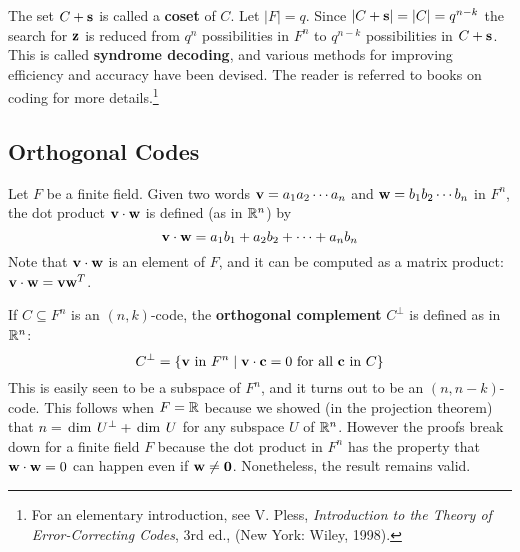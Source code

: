 The set $C + \textbf{s}$ is called a \textbf{coset} of $C$. Let $|F| = q$. Since $|C + \textbf{s}| = |C| = q^{n - k}$ the search for $\textbf{z}$ is reduced from $q^{n}$ possibilities in $F^{n}$ to $q^{n - k}$ possibilities in $C + \textbf{s}$. This is called \textbf{syndrome decoding},  and various methods for improving efficiency and accuracy have been devised. The reader is referred to books on coding for more details.\footnote{For an elementary introduction, see V. Pless, \textit{Introduction to the Theory of Error-Correcting Codes}, 3rd ed., (New York: Wiley, 1998).}%

\subsection*{Orthogonal Codes}

Let $F$ be a finite field. Given two words $\textbf{v} = a_{1} a_{2} \cdots a_{n}$ and $\textbf{w} = b_{1} b_{2} \cdots b_{n}$ in $F^{n}$, the dot product $\textbf{v} \cdot \textbf{w}$ is defined (as in $\mathbb{R}^n$) by
\begin{equation*}
\textbf{v} \cdot \textbf{w} = a_{1}b_{1} + a_{2}b_{2} + \dots + a_{n}b_{n}
\end{equation*}
Note that $\textbf{v} \cdot \textbf{w}$ is an element of $F$, and it can be computed as a matrix product: $\textbf{v}\cdot\textbf{w} = \textbf{v}\textbf{w}^{T}$.

If $C \subseteq F^{n}$ is an $(n, k)$-code, the \textbf{orthogonal complement} $C^{\perp}$ is defined as in $\mathbb{R}^n$:
\begin{equation*}
C^\perp = \{\textbf{v} \mbox{ in } F^n \mid \textbf{v} \cdot \textbf{c} = 0 \mbox{ for all } \textbf{c} \mbox{ in } C \}
\end{equation*}
This is easily seen to be a subspace of $F^{n}$, and it turns out to be an $(n, n - k)$-code. This follows when $F = \mathbb{R}$ because we showed (in the projection theorem) that $n = \thinspace\operatorname{dim\medspace} U^{\perp} + \thinspace\operatorname{dim\medspace} U$ for any subspace $U$ of $\mathbb{R}^n$. However the proofs break down for a finite field $F$ because the dot product in $F^{n}$ has the property that $\textbf{w} \cdot \textbf{w} = 0$ can happen even if $\textbf{w} \neq \textbf{0}$. Nonetheless, the result remains valid.

